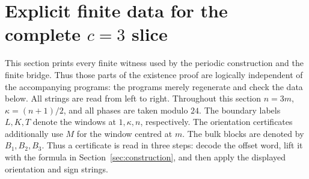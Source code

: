 \section{Explicit finite data for the complete \texorpdfstring{$c=3$}{c=3} slice}\label{sec:certificates}
This section prints every finite witness used by the periodic construction and the finite bridge.
Thus those parts of the existence proof are logically independent of the accompanying programs:
the programs merely regenerate and check the data below.  All strings are read from left to right.
Throughout this section \(n=3m\), \(\kappa=(n+1)/2\), and all phases are taken modulo \(24\).
The boundary labels \(L,K,T\) denote the windows at \(1,\kappa,n\), respectively.
The orientation certificates additionally use \(M\) for the window centred at \(m\).
The bulk blocks are denoted
by \(B_1,B_2,B_3\).  Thus a certificate is read in three steps: decode the offset word,
lift it with the formula in Section~\ref{sec:construction}, and then apply the displayed orientation
and sign strings.

